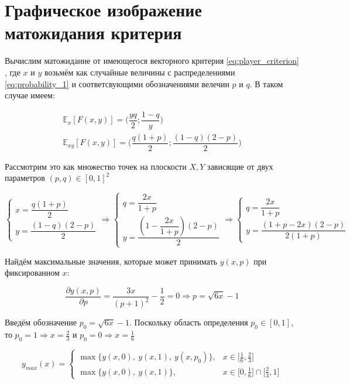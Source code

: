 \section{Графическое изображение матожидания критерия}
Вычислим матожидание от имеющегося векторного критерия \eqref{eq:player_criterion}
, где $x$ и $y$ возьмём как случайные величины с распределениями \eqref{eq:probability_1}
и соответсвующими обозначениями велечин $p$ и $q$. В таком случае имеем:

\begin{gather*}
	\mathbb{E}_x [F(x,y)]=
	\Big(
		\dfrac{yq}{2};
		\dfrac{1-q}{y}
	\Big)
	\\
	\mathbb{E}_{xy} [F(x,y)]=
	\big(
		\dfrac{q(1+p)}{2};
		\dfrac{(1-q)(2-p)}{2}
	\Big)
\end{gather*}

Рассмотрим это как множество точек на плоскости $X,Y$ зависящие от двух
 параметров $(p,q)\in[0,1]^2$

$$
	\begin{cases}
		x = \dfrac{q(1 + p)}{2} \\
		y = \dfrac{(1 - q)(2 - p)}{2}  
	\end{cases}
	\Rightarrow
	\begin{cases}
		q = \dfrac{2x}{1 + p} \\
		y = \dfrac{(1 - \dfrac{2x}{1 + p})(2 - p)}{2}		
	\end{cases}
	\Rightarrow
	\begin{cases}
		q = \dfrac{2x}{1 + p} \\
		y = \dfrac{(1 + p - 2x)(2 - p)}{2(1 + p)}
	\end{cases}
$$

Найдём максимальные значения, которые может принимать $y(x, p)$ при фиксированном $x$:

$$
	\dfrac{\partial y(x, p)}{\partial p}=\frac{3x}{(p+1)^2} - \frac{1}{2} = 0 
	\Rightarrow
	p = \sqrt{6x} - 1
$$

Введём обозначение $p_0 = \sqrt{6x} - 1$. Поскольку область определения 
$p_0 \in [0, 1]$, то $p_0 = 1 \Rightarrow x = \frac{2}{3}$ и 
$p_0 = 0 \Rightarrow x = \frac{1}{6}$
 
$$
	y_{max}(x) = 
	\begin{cases}
		\max \{ y(x, 0), \: y(x, 1), \: y(x, p_0) \}, & 
		x \in \big[ \frac{1}{6}, \frac{2}{3} \big]
		\\
		\max \{ y(x, 0), \: y(x, 1) \}, &
		x \in \big[0, \frac{1}{6} \big] \cap \big[\frac{2}{3}, 1\big]
	\end{cases}
$$

